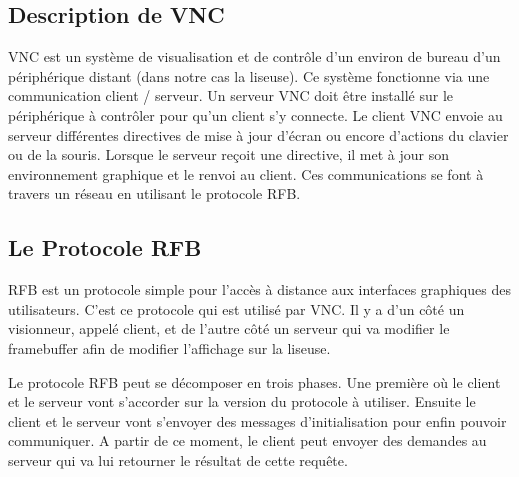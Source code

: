 \subsection{Description de VNC}

VNC est un système de visualisation et de contrôle d'un environ de bureau d'un périphérique distant (dans notre cas la liseuse). Ce système fonctionne via une communication client / serveur. Un serveur VNC doit être installé sur le périphérique à contrôler pour qu'un client s'y connecte. Le client VNC envoie au serveur différentes directives de mise à jour d'écran ou encore d'actions du clavier ou de la souris. Lorsque le serveur reçoit une directive, il met à jour son environnement graphique et le renvoi au client. Ces communications se font à travers un réseau en utilisant le protocole RFB.

\subsection{Le Protocole RFB}

RFB est un protocole simple pour l'accès à distance aux interfaces graphiques des utilisateurs. C'est ce protocole qui est utilisé par VNC. Il y a d'un côté un visionneur, appelé client, et de l'autre côté un serveur qui va modifier le framebuffer afin de modifier l'affichage sur la liseuse.

Le protocole RFB peut se décomposer en trois phases. Une première où le client et le serveur vont s'accorder sur la version du protocole à utiliser. Ensuite le client et le serveur vont s'envoyer des messages d'initialisation pour enfin pouvoir communiquer. A partir de ce moment, le client peut envoyer des demandes au serveur qui va lui retourner le résultat de cette requête.


